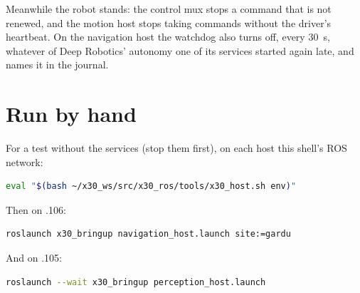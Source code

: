 Meanwhile the robot stands: the control mux stops a command that is not renewed, and the motion
host stops taking commands without the driver's heartbeat. On the navigation host the watchdog
also turns off, every 30~s, whatever of Deep Robotics' autonomy one of its services started
again late, and names it in the journal.

\section{Run by hand}

For a test without the services (stop them first), on each host this shell's ROS network:

\begin{lstlisting}[language=bash]
eval "$(bash ~/x30_ws/src/x30_ros/tools/x30_host.sh env)"
\end{lstlisting}

Then on .106:

\begin{lstlisting}[language=bash]
roslaunch x30_bringup navigation_host.launch site:=gardu
\end{lstlisting}

And on .105:

\begin{lstlisting}[language=bash]
roslaunch --wait x30_bringup perception_host.launch
\end{lstlisting}
